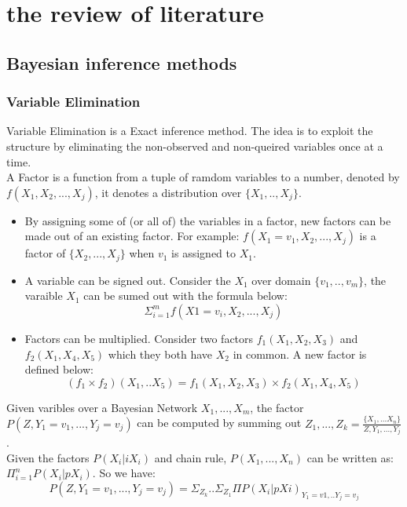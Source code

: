 \newpage
\section{the review of literature}
    \subsection{Bayesian inference methods}
        \subsubsection{Variable Elimination}
        Variable Elimination is a Exact inference method. The idea is to exploit the structure by eliminating the non-observed and non-queired variables once at a time.\\
        A Factor is a function from a tuple of ramdom variables to a number, denoted by $f(X_{1}, X_{2}, ... , X_{j})$, it denotes a distribution over $\{X_{1}, .., X_{j}\}$. 
        \begin{itemize}
            \item  By assigning some of (or all of) the variables in a factor, new factors can be made out of an existing factor. For example: $f(X_{1} = v_{1}, X_{2}, ..., X_{j})$ is a factor of $\{X_{2}, ... , X_{j}\}$ when $v_{1}$ is assigned to $X_{1}$.
            \item A variable can be signed out. Consider the $X_{1}$ over domain $\{v_{1}, .. ,v_{m}\}$, the varaible $X_{1}$ can be sumed out with the formula below: $$\Sigma_{i= 1}^{m}f(X1 = v_{i}, X_{2}, ..., X_{j})$$
            \item Factors can be multiplied. Consider two factors $f_{1}(X_{1}, X_{2}, X_{3})$ and $f_{2}(X_{1}, X_{4}, X_{5})$ which they both have $X_{2}$ in common. A new factor is defined below: $$(f_{1} \times f_{2})(X_{1}, .. X_{5}) = f_{1}(X_{1}, X_{2}, X_{3}) \times f_{2}(X_{1}, X_{4}, X_{5}) $$
        \end{itemize}
        Given varibles over a Bayesian Network $X_{1}, ... , X_{m}$, the factor $P(Z, Y_{1}=v_{1}, ... , Y_{j}= v_{j})$ can be computed by summing out $Z_{1}, ..., Z_{k} =  \frac{\{X_{1}, ... X_{n}\}}{Z, Y_{1}, ..., Y_{j}}$.\\
        
        Given the factors $P(X_{i}|iX_{i})$ and chain rule, $P(X_{1}, ..., X_{n})$ can be written as: $\Pi_{i = 1}^{n} P(X_{i}|pX_{i})$. So we have:
        $$P(Z, Y_{1}=v_{1}, ... , Y_{j}= v_{j}) = \Sigma_{Z_{k}}.. \Sigma_{Z_{1}} \Pi P(X_{i}|pX{i})_{Y_{1} = v1, .. Y_{j} = v_{j}}$$
